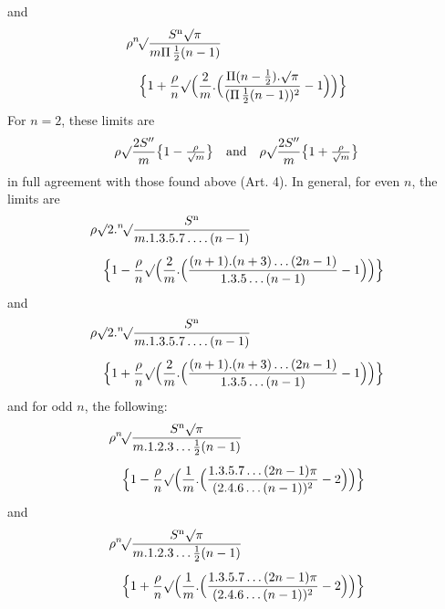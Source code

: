 and
\[
\begin{aligned}
&\rho\BareRoot[n]{\frac{S^{\mathrm n}\surd\pi}{m\Pi\,\frac12(n-1)}}\\[3pt]
&\quad\Bigl\{1+\frac\rho n\surd\Bigl(\frac2m.\Bigl(\frac{\Pi(n-\frac12).\surd\pi}{(\Pi\,\frac12(n-1))^2}-1\Bigr)\Bigr)\Bigr\}
\end{aligned}
\]
For \(n=2\), these limits are
\[
\rho\surd\frac{2S''}{m}\bigl\{1-\tfrac\rho{\surd m}\bigr\}\quad\text{and}\quad
\rho\surd\frac{2S''}{m}\bigl\{1+\tfrac\rho{\surd m}\bigr\}
\]
in full agreement with those found above (Art. 4). In general, for even \(n\), the limits are
\[
\begin{aligned}
&\rho\surd2.\BareRoot[n]{\frac{S^{\mathrm n}}{m.1.3.5.7\, .\,.\,.\,.\,(n-1)}}\\[4pt]
&\quad\Bigl\{1-\frac\rho n\surd\Bigl(\frac2m.\Bigl(\frac{(n+1).(n+3)\, .\,.\,.\,(2n-1)}{1.3.5\, .\,.\,.\,(n-1)}-1\Bigr)\Bigr)\Bigr\}
\end{aligned}
\]
and
\[
\begin{aligned}
&\rho\surd2.\BareRoot[n]{\frac{S^{\mathrm n}}{m.1.3.5.7\, .\,.\,.\,.\,(n-1)}}\\[4pt]
&\quad\Bigl\{1+\frac\rho n\surd\Bigl(\frac2m.\Bigl(\frac{(n+1).(n+3)\, .\,.\,.\,(2n-1)}{1.3.5\, .\,.\,.\,(n-1)}-1\Bigr)\Bigr)\Bigr\}
\end{aligned}
\]
and for odd \(n\), the following:
\[
\begin{aligned}
&\rho\BareRoot[n]{\frac{S^{\mathrm n}\surd\pi}{m.1.2.3\, .\,.\,.\,\frac12(n-1)}}\\[4pt]
&\quad\Bigl\{1-\frac\rho n\surd\Bigl(\frac1m.\Bigl(\frac{1.3.5.7\, .\,.\,.\,(2n-1)\pi}{(2.4.6\, .\,.\,.\,(n-1))^2}-2\Bigr)\Bigr)\Bigr\}
\end{aligned}
\]
and
\[
\begin{aligned}
&\rho\BareRoot[n]{\frac{S^{\mathrm n}\surd\pi}{m.1.2.3\, .\,.\,.\,\frac12(n-1)}}\\[4pt]
&\quad\Bigl\{1+\frac\rho n\surd\Bigl(\frac1m.\Bigl(\frac{1.3.5.7\, .\,.\,.\,(2n-1)\pi}{(2.4.6\, .\,.\,.\,(n-1))^2}-2\Bigr)\Bigr)\Bigr\}
\end{aligned}
\]

